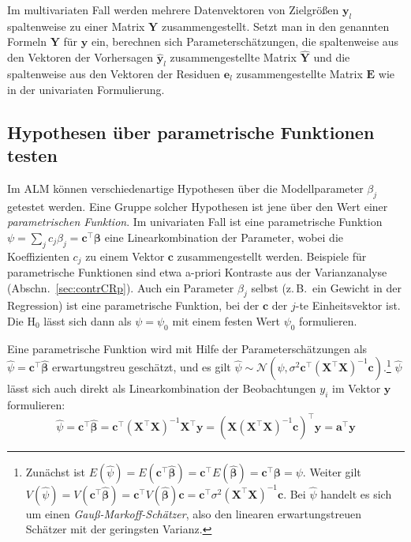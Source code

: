 Im multivariaten Fall werden mehrere Datenvektoren von Zielgrößen $\bm{y}_{l}$ spaltenweise zu einer Matrix $\bm{Y}$ zusammengestellt. Setzt man in den genannten Formeln $\bm{Y}$ für $\bm{y}$ ein, berechnen sich Parameterschätzungen, die spaltenweise aus den Vektoren der Vorhersagen $\hat{\bm{y}}_{l}$ zusammengestellte Matrix $\hat{\bm{Y}}$ und die spaltenweise aus den Vektoren der Residuen $\bm{e}_{l}$ zusammengestellte Matrix $\bm{E}$ wie in der univariaten Formulierung.

\subsection{Hypothesen über parametrische Funktionen testen}
\label{sec:multALMctr}

Im ALM können verschiedenartige Hypothesen über die Modellparameter $\beta_{j}$ getestet werden. Eine Gruppe solcher Hypothesen ist jene über den Wert einer \emph{parametrischen Funktion}. Im univariaten Fall ist eine parametrische Funktion $\psi = \sum_{j} c_{j} \beta_{j} = \bm{c}^{\top} \bm{\beta}$ eine Linearkombination der Parameter, wobei die Koeffizienten $c_{j}$ zu einem Vektor $\bm{c}$ zusammengestellt werden. Beispiele für parametrische Funktionen sind etwa a-priori Kontraste aus der Varianzanalyse (Abschn.\ \ref{sec:contrCRp}). Auch ein Parameter $\beta_{j}$ selbst (z.\,B.\ ein Gewicht in der Regression) ist eine parametrische Funktion, bei der $\bm{c}$ der $j$-te Einheitsvektor ist. Die $\text{H}_{0}$ lässt sich dann als $\psi = \psi_{0}$ mit einem festen Wert $\psi_{0}$ formulieren.

Eine parametrische Funktion wird mit Hilfe der Parameterschätzungen als $\hat{\psi} = \bm{c}^{\top} \hat{\bm{\beta}}$ erwartungstreu geschätzt, und es gilt $\hat{\psi} \sim \mathcal{N}(\psi, \sigma^{2} \bm{c}^{\top} (\bm{X}^{\top} \bm{X})^{-1} \bm{c})$.\footnote{Zunächst ist $E(\hat{\psi}) = E(\bm{c}^{\top} \hat{\bm{\beta}}) = \bm{c}^{\top} E(\hat{\bm{\beta}}) = \bm{c}^{\top} \bm{\beta} = \psi$. Weiter gilt $V(\hat{\psi}) = V(\bm{c}^{\top} \hat{\bm{\beta}}) = \bm{c}^{\top} V(\hat{\bm{\beta}}) \bm{c} = \bm{c}^{\top} \sigma^{2} (\bm{X}^{\top} \bm{X})^{-1} \bm{c}$. Bei $\hat{\psi}$ handelt es sich um einen \emph{Gauß-Markoff-Schätzer}, also den linearen erwartungstreuen Schätzer mit der geringsten Varianz.} $\hat{\psi}$ lässt sich auch direkt als Linearkombination der Beobachtungen $y_{i}$ im Vektor $\bm{y}$ formulieren:
\begin{equation*}
\hat{\psi} = \bm{c}^{\top} \hat{\bm{\beta}} = \bm{c}^{\top} (\bm{X}^{\top} \bm{X})^{-1} \bm{X}^{\top} \bm{y} = (\bm{X} (\bm{X}^{\top} \bm{X})^{-1} \bm{c})^{\top} \bm{y} = \bm{a}^{\top} \bm{y}
\end{equation*}

